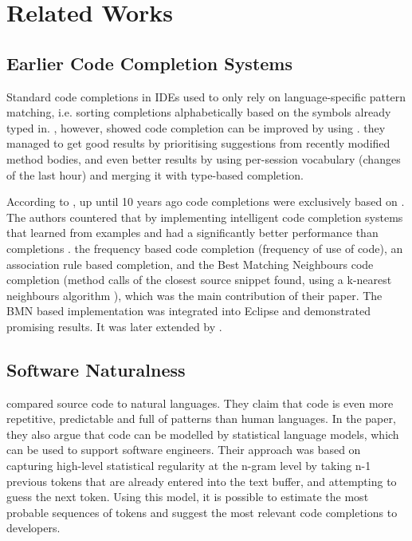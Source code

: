 \chapter{Related Works}
\label{chap:RelatedWorks}

\section{Earlier Code Completion Systems}
\label{sec:RelatedWorks-EarlierSystems}
Standard code completions in IDEs used to only rely on language-specific pattern matching, i.e. sorting completions alphabetically based on the symbols already typed in. \cite{Robb08a}, however, showed code completion can be improved by using . they managed to get good results by prioritising suggestions from recently modified method bodies, and even better results by using per-session vocabulary (changes of the last hour) and merging it with type-based completion.

According to \cite{Bruc09a}, up until 10 years ago code completions were exclusively based on . The authors countered that by implementing intelligent code completion systems that learned from examples and had a significantly better performance  than  completions .  the frequency based code completion (frequency of use of code), an association rule based completion, and the Best Matching Neighbours code completion (method calls of the closest source snippet found, using a  k-nearest neighbours algorithm ), which was the main contribution of their paper. The BMN based implementation was integrated into Eclipse and demonstrated promising results. It was later extended by \cite{Prok15a}. 

\section{Software Naturalness}
\label{sec:RelatedWorks-SoftwareNaturalness}
  \cite{Hind12a} compared source code to natural languages. They claim that code is even more repetitive, predictable and full of patterns than human languages. In the paper, they also argue that code can be modelled by statistical language models, which can be used to support software engineers. Their approach was based on capturing high-level statistical regularity at the n-gram level by taking n-1 previous tokens that are already entered into the text buffer, and attempting to guess the next token. Using this model, it is possible to estimate the most probable sequences of tokens and suggest the most relevant code completions to developers.

